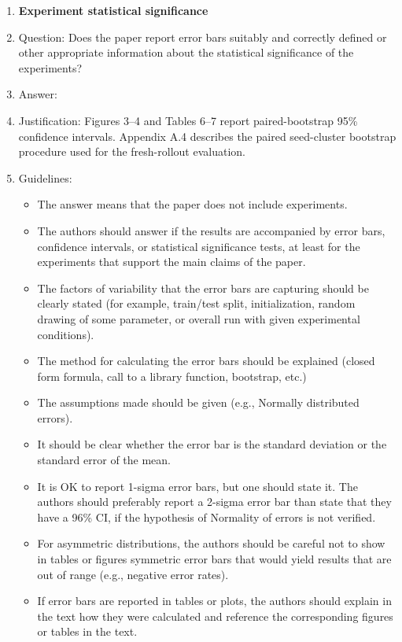 \documentclass{article}
\begin{document}
\begin{enumerate}
\item {\bf Experiment statistical significance}
    \item[] Question: Does the paper report error bars suitably and correctly defined or other appropriate information about the statistical significance of the experiments?
    \item[] Answer: \answerYes{}
    \item[] Justification: Figures 3–4 and Tables 6–7 report paired-bootstrap 95\% confidence intervals. Appendix A.4 describes the paired seed-cluster bootstrap procedure used for the fresh-rollout evaluation.
    \item[] Guidelines:
    \begin{itemize}
        \item The answer \answerNA{} means that the paper does not include experiments.
        \item The authors should answer \answerYes{} if the results are accompanied by error bars, confidence intervals, or statistical significance tests, at least for the experiments that support the main claims of the paper.
        \item The factors of variability that the error bars are capturing should be clearly stated (for example, train/test split, initialization, random drawing of some parameter, or overall run with given experimental conditions).
        \item The method for calculating the error bars should be explained (closed form formula, call to a library function, bootstrap, etc.)
        \item The assumptions made should be given (e.g., Normally distributed errors).
        \item It should be clear whether the error bar is the standard deviation or the standard error of the mean.
        \item It is OK to report 1-sigma error bars, but one should state it. The authors should preferably report a 2-sigma error bar than state that they have a 96\% CI, if the hypothesis of Normality of errors is not verified.
        \item For asymmetric distributions, the authors should be careful not to show in tables or figures symmetric error bars that would yield results that are out of range (e.g., negative error rates).
        \item If error bars are reported in tables or plots, the authors should explain in the text how they were calculated and reference the corresponding figures or tables in the text.
    \end{itemize}


\end{enumerate}
\end{document}

